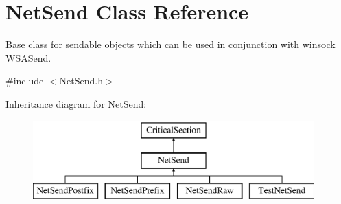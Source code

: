 \hypertarget{class_net_send}{
\section{NetSend Class Reference}
\label{class_net_send}
}


Base class for sendable objects which can be used in conjunction with winsock WSASend.  




{\ttfamily \#include $<$NetSend.h$>$}

Inheritance diagram for NetSend:\begin{figure}[H]
\begin{center}
\leavevmode
\includegraphics[height=3.000000cm]{class_net_send}
\end{center}
\end{figure}
